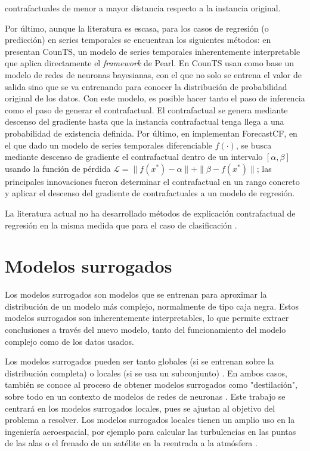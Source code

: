 \documentclass[12pt]{report} %
\begin{document}
contrafactuales de menor a mayor distancia respecto a la instancia original.


Por último, aunque la literatura es escasa, para los casos de regresión (o predicción) en series temporales se encuentran los siguientes métodos: en \cite{Yan2023} presentan CounTS, un modelo de series temporales inherentemente interpretable que aplica directamente el \textit{framework} de Pearl. En CounTS usan como base un modelo de redes de neuronas bayesianas, con el que no solo se entrena el valor de salida sino que se va entrenando para conocer la distribución de probabilidad original de los datos. Con este modelo, es posible hacer tanto el paso de inferencia como el paso de generar el contrafactual. El contrafactual se genera mediante descenso del gradiente hasta que la instancia contrafactual tenga llega a una probabilidad de existencia definida. Por último, en \cite{Wang2023} implementan ForecastCF, en el que dado un modelo de series temporales diferenciable $f(\cdot)$, se busca mediante descenso de gradiente el contrafactual dentro de un intervalo $[\alpha, \beta]$ usando la función de pérdida $\mathcal{L} =\|f(x^*) - \alpha\| + \|\beta - f(x^*)\|$; las principales innovaciones fueron determinar el contrafactual en un rango concreto y aplicar el descenso del gradiente de contrafactuales a un modelo de regresión.

La literatura actual no ha desarrollado métodos de explicación contrafactual de regresión en la misma medida que para el caso de clasificación \cite{Guidotti2022}.

\section{Modelos surrogados}

Los modelos surrogados son modelos que se entrenan para aproximar la distribución de un modelo más complejo, normalmente de tipo caja negra. Estos modelos surrogados son inherentemente interpretables, lo que permite extraer conclusiones a través del nuevo modelo, tanto del funcionamiento del modelo complejo como de los datos usados.

Los modelos surrogados pueden ser tanto globales (si se entrenan sobre la distribución completa) o locales (si se usa un subconjunto) \cite{Kamath2021, molnar2025}. En ambos casos, también se conoce al proceso de obtener modelos surrogados como "destilación", sobre todo en un contexto de modelos de redes de neuronas \cite{hinton2015}. Este trabajo se centrará en los modelos surrogados locales, pues se ajustan al objetivo del problema a resolver. Los modelos surrogados locales tienen un amplio uso en la ingeniería aeroespacial, por ejemplo para calcular las turbulencias en las puntas de las alas o el frenado de un satélite en la reentrada a la atmósfera \cite{Ghosh2021}.
\end{document}
